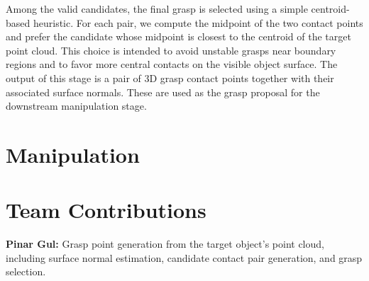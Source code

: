 \documentclass[conference]{IEEEtran}
\begin{document}
Among the valid candidates, the final grasp is selected using a simple centroid-based heuristic. For each pair, we compute the midpoint of the two contact points and prefer the candidate whose midpoint is closest to the centroid of the target point cloud. This choice is intended to avoid unstable grasps near boundary regions and to favor more central contacts on the visible object surface. The output of this stage is a pair of 3D grasp contact points together with their associated surface normals. These are used as the grasp proposal for the downstream manipulation stage.
\section{Manipulation}

\section*{Team Contributions}
\textbf{Pinar Gul:} Grasp point generation from the target object's point cloud, including surface normal estimation, candidate contact pair generation, and grasp selection.\\

\end{document}
